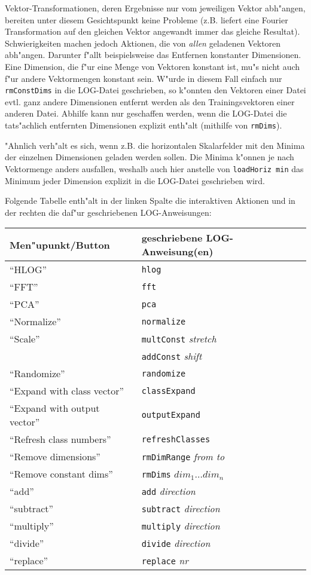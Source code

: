 Vektor-Transformationen, deren Ergebnisse nur vom jeweiligen Vektor 
abh"angen, bereiten unter diesem Gesichtspunkt keine Probleme
(z.B. liefert eine Fourier Transformation auf den gleichen Vektor angewandt
immer das gleiche Resultat).
Schwierigkeiten machen jedoch Aktionen, die von {\it allen} geladenen
Vektoren abh"angen.
Darunter f"allt beispielsweise das Entfernen konstanter Dimensionen.
Eine Dimension, die f"ur eine Menge von Vektoren konstant ist, mu"s
nicht auch f"ur andere Vektormengen konstant sein.
W"urde in diesem Fall einfach nur {\tt rmConstDims} in die LOG-Datei
geschrieben, so k"onnten den Vektoren einer Datei evtl. ganz andere Dimensionen
entfernt werden als den Trainingsvektoren einer anderen Datei. 
Abhilfe kann nur geschaffen werden, wenn die LOG-Datei  
die tats"achlich entfernten Dimensionen explizit enth"alt (mithilfe
von {\tt rmDims}).      

"Ahnlich verh"alt es sich, wenn z.B. die horizontalen Skalarfelder 
mit den Minima der einzelnen Dimensionen geladen werden sollen.
Die Minima k"onnen je nach Vektormenge anders ausfallen, weshalb auch
hier anstelle von {\tt loadHoriz min} 
das Minimum jeder Dimension explizit in die LOG-Datei geschrieben wird.

Folgende Tabelle enth"alt in der linken Spalte die 
interaktiven Aktionen und in der rechten die daf"ur geschriebenen 
LOG-Anweisungen:

\begin{tabular}{l|l}
{\bf Men"upunkt/Button} & {\bf geschriebene LOG-Anweisung(en)} \\ \hline
"`HLOG"' & {\tt hlog} \\
"`FFT"' & {\tt fft} \\
"`PCA"' & {\tt pca} \\
"`Normalize"' & {\tt normalize} \\
"`Scale"' & {\tt multConst} {\it stretch} \\
& {\tt addConst} {\it shift} \\
"`Randomize"' & {\tt randomize} \\
"`Expand with class vector"' & {\tt classExpand} \\
"`Expand with output vector"' & {\tt outputExpand} \\
"`Refresh class numbers"' & {\tt refreshClasses} \\
"`Remove dimensions"' & {\tt rmDimRange} {\it from to} \\
"`Remove constant dims"' & {\tt rmDims} $dim_1 \ldots dim_n$ \\
"`add"' & {\tt add} {\it direction} \\
"`subtract"' & {\tt subtract} {\it direction} \\
"`multiply"' & {\tt multiply} {\it direction} \\
"`divide"' & {\tt divide} {\it direction} \\
"`replace"' & {\tt replace} {\it nr} \\
\end{tabular}

